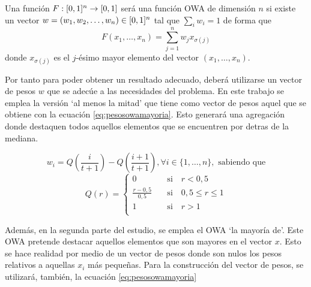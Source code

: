 \documentclass[main]{subfiles}
\begin{document}
\begin{definition}\label{def:owa}
Una  función $F:[0,1]^n\rightarrow[0,1]$ será una función OWA de dimensión $n$ si existe un vector $w=(w_{1},w_{2},\dots,w_{n})\in [0,1]^{n}$ tal que $\sum_{i}w_{i}=1$ de forma que
$$F(x_{1},\dots,x_{n})=\sum^{n}_{j=1}w_{j}x_{\sigma(j)}$$
donde $x_{\sigma(j)}$ es el $j$-ésimo mayor elemento del vector $(x_{1},\dots,x_{n})$.
\end{definition}

Por tanto para poder obtener un resultado adecuado, deberá utilizarse un vector de pesos $w$ que se adecúe a las necesidades del problema. En este trabajo se emplea la versión `al menos la mitad' %
 que tiene como vector de pesos aquel que se obtiene con la ecuación \ref{eq:pesosowamayoria}. Esto generará una agregación donde destaquen todos aquellos elementos que se encuentren por detras de la mediana.

\begin{equation}\label{eq:pesosowamayoria}
	 w_i = Q\left(\frac{i}{t+1}\right) - Q\left(\frac{i+1}{t+1}\right), \forall i\in \{1, \dots, n\}, \text{   sabiendo que}
\end{equation}
	 $$Q(r) = \left\{\begin{aligned}
	 	0 					&\quad \text{si}\quad r<0,5\\
	 	\frac{r-0,5}{0,5}	&\quad \text{si}\quad 0,5\leq r\leq 1\\
	 	1 					&\quad \text{si}\quad r>1\\
	\end{aligned}\right.$$

Además, en la segunda parte del estudio, se emplea el OWA `la mayoría de'. Este OWA pretende destacar aquellos elementos que son mayores en el vector $x$. Esto se hace realidad por medio de un vector de pesos donde son nulos los pesos relativos a aquellas $x_i$ más pequeñas. Para la construcción del vector de pesos, se utilizará, también, la ecuación \ref{eq:pesosowamayoria}



\end{document}
